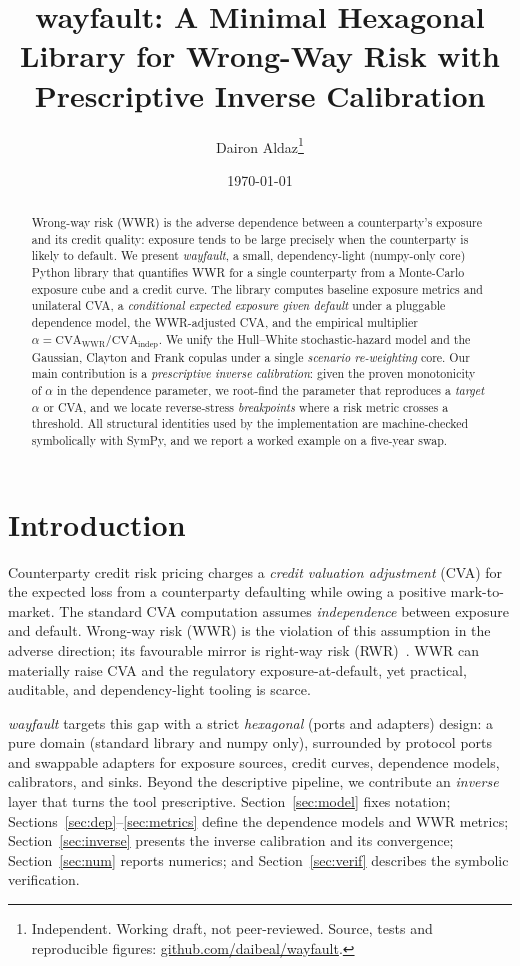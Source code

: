 \documentclass[twocolumn,10pt]{article}
\title{\textbf{\large wayfault: A Minimal Hexagonal Library for Wrong-Way Risk
with Prescriptive Inverse Calibration}}
\author{Dairon Aldaz\thanks{Independent. Working draft, not peer-reviewed.
Source, tests and reproducible figures:
\href{https://github.com/daibeal/wayfault}{github.com/daibeal/wayfault}.}}
\date{\today}
\newcommand{\CVA}{\mathrm{CVA}}
\begin{document}
\maketitle

\begin{abstract}
\noindent
Wrong-way risk (WWR) is the adverse dependence between a counterparty's
exposure and its credit quality: exposure tends to be large precisely when the
counterparty is likely to default. We present \emph{wayfault}, a small,
dependency-light (numpy-only core) Python library that quantifies WWR for a
single counterparty from a Monte-Carlo exposure cube and a credit curve. The
library computes baseline exposure metrics and unilateral CVA, a
\emph{conditional expected exposure given default} under a pluggable dependence
model, the WWR-adjusted CVA, and the empirical multiplier
$\alpha=\CVA_{\text{WWR}}/\CVA_{\text{indep}}$. We unify the Hull--White
stochastic-hazard model and the Gaussian, Clayton and Frank copulas under a
single \emph{scenario re-weighting} core. Our main contribution is a
\emph{prescriptive inverse calibration}: given the proven monotonicity of
$\alpha$ in the dependence parameter, we root-find the parameter that reproduces
a \emph{target} $\alpha$ or CVA, and we locate reverse-stress \emph{breakpoints}
where a risk metric crosses a threshold. All structural identities used by the
implementation are machine-checked symbolically with SymPy, and we report a
worked example on a five-year swap.
\end{abstract}

\section{Introduction}
Counterparty credit risk pricing charges a \emph{credit valuation adjustment}
(CVA) for the expected loss from a counterparty defaulting while owing a
positive mark-to-market. The standard CVA computation assumes \emph{independence}
between exposure and default. Wrong-way risk (WWR) is the violation of this
assumption in the adverse direction; its favourable mirror is right-way risk
(RWR)~\cite{hullwhite2012,gregory}. WWR can materially raise CVA and the
regulatory exposure-at-default, yet practical, auditable, and dependency-light
tooling is scarce.

\emph{wayfault} targets this gap with a strict \emph{hexagonal} (ports and
adapters) design: a pure domain (standard library and numpy only), surrounded by
protocol ports and swappable adapters for exposure sources, credit curves,
dependence models, calibrators, and sinks. Beyond the descriptive pipeline, we
contribute an \emph{inverse} layer that turns the tool prescriptive. Section~\ref{sec:model}
fixes notation; Sections~\ref{sec:dep}--\ref{sec:metrics} define the dependence
models and WWR metrics; Section~\ref{sec:inverse} presents the inverse
calibration and its convergence; Section~\ref{sec:num} reports numerics; and
Section~\ref{sec:verif} describes the symbolic verification.
\end{document}
